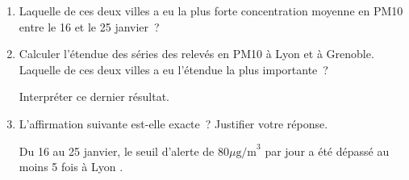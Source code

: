 \medbreak
\begin{enumerate}
     \item Laquelle de ces deux villes a eu la plus forte concentration moyenne en PM10 entre le 16 et le 25 janvier~?
     \item Calculer l'étendue des séries des relevés en PM10 à Lyon et à Grenoble. Laquelle de ces deux villes a eu l'étendue la plus importante~?
     \par
     Interpréter ce dernier résultat.
     \item L'affirmation suivante est-elle exacte~? Justifier votre réponse.
     \par
     \og Du 16 au 25 janvier, le seuil d'alerte de 80$\mu\text{g/m}^3$ par jour a été dépassé au moins 5 fois à Lyon \fg.
\end{enumerate}
